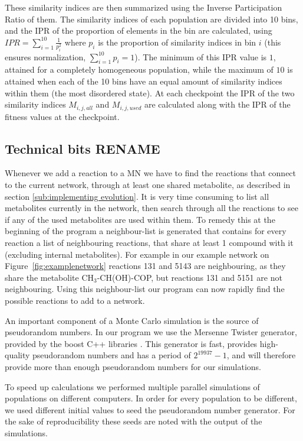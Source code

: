 \documentclass[a4paper,12pt]{article}
\begin{document}
These similarity indices are then summarized using the Inverse Participation Ratio of them. The similarity indices of each population are divided into 10 bins, and the IPR of the proportion of elements in the bin are calculated, using $IPR= \sum^{10}_{i=1} \frac{1}{p_i^2} $ where $p_i$ is the proportion of similarity indices in bin $i$ (this ensures normalization, $ \sum^{10}_{i=1} p_i=1$). The minimum of this IPR value is $1$, attained for a completely homogeneous population, while the maximum of $10$ is attained when each of the 10 bins have an equal amount of similarity indices within them (the most disordered state).  At each checkpoint the IPR of the two similarity indices $M_{i,j,all}$ and $M_{i,j,used}$ are calculated along with the IPR of the fitness values at the checkpoint. 




\subsection{Technical bits RENAME}
\label{sub:technical_bits}


	Whenever we add a reaction to a MN we have to find the reactions that connect to the current network, through at least one shared metabolite, as described in section \ref{sub:implementing evolution}. It is very time consuming to list all metabolites currently in the network, then search through all the reactions to see if any of the used metabolites are used within them. To remedy this at the beginning of the program a neighbour-list is generated that contains for every reaction a list of neighbouring reactions, that share at least 1 compound with it (excluding internal metabolites). For example in our example network on Figure~\ref{fig:examplenetwork} reactions 131 and 5143 are neighbouring, as they share the metabolite CH$_3$-CH(OH)-COP, but reactions 131 and 5151 are not neighbouring. Using this neighbour-list our program can now rapidly find the possible reactions to add to a network. 

	An important component of a Monte Carlo simulation is the source of pseudorandom numbers. In our program we use the Mersenne Twister \cite{mersennetwister} generator, provided by the boost C++ libraries \cite{boostlibraries}. This generator is fast, provides high-quality pseudorandom numbers and has a period of $2^{19937}-1$, and will therefore provide more than enough pseudorandom numbers for our simulations.

	To speed up calculations we performed multiple parallel simulations of populations on different computers. In order for every population to be different, we used different initial values to seed the pseudorandom number generator. For the sake of reproducibility these seeds are noted with the output of the simulations. 
\end{document}
